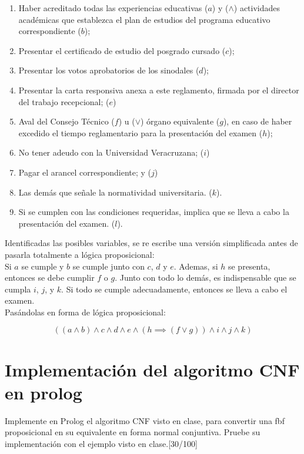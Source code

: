 \documentclass[11pt, letterpaper]{article}
\begin{document}
	\begin{enumerate}[I]
	\item Haber acreditado todas las experiencias educativas ($a$) y ($\wedge$) actividades académicas que establezca el plan de estudios del programa educativo correspondiente ($b$);
	
	\item Presentar el certificado de estudio del posgrado cursado ($c$);
	\item Presentar los votos aprobatorios de los sinodales ($d$);
	\item Presentar la carta responsiva anexa a este reglamento, firmada por el director del trabajo recepcional; ($e$)
	\item Aval del Consejo Técnico ($f$) u ($\vee$) órgano equivalente ($g$), en caso de haber excedido el tiempo reglamentario para la presentación del examen ($h$);
	\item No tener adeudo con la Universidad Veracruzana; ($i$)
	\item Pagar el arancel correspondiente; y ($j$)
	\item Las demás que señale la normatividad universitaria. ($k$).
	\item Si se cumplen con las condiciones requeridas, implica que se lleva a cabo la presentación del examen. ($l$).
	\end{enumerate}

	Identificadas las posibles variables, se re escribe una versión simplificada antes de pasarla totalmente a lógica proposicional: \\
	
	Si $a$ se cumple y $b$ se cumple junto con $c$, $d$ y $e$. Ademas, si $h$ se presenta, entonces se debe cumplir $f$ o $g$. Junto con todo lo demás, es indispensable que se cumpla $i$, $j$, y $k$. Si todo se cumple adecuadamente, entonces se lleva a cabo el examen. \\
	
	Pasándolas en forma de lógica proposicional:
	
	$$((a \wedge b) \wedge c \wedge d \wedge e \wedge (h \implies (f \vee g)) \wedge i \wedge j \wedge k)$$
	
	
	\newpage
	
	\section{Implementación del algoritmo CNF en prolog}
	
	Implemente en Prolog el algoritmo CNF visto en clase, para convertir una
	fbf proposicional en su equivalente en forma normal conjuntiva. Pruebe su
	implementación con el ejemplo visto en clase.[30/100]
	
\end{document}
